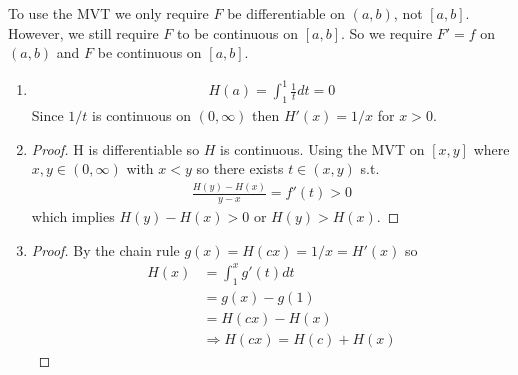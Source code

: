 To use the MVT we only require $F$ be differentiable on $(a,b)$,
not $[a,b]$. However, we still require $F$ to be continuous on 
$[a,b]$.
So we require $F'=f$ on $(a,b)$ and $F$ be continuous on $[a,b]$.

\begin{enumerate}[label=(\alph*)]
    \item 
    \begin{align*}
        H(a) = \int_1^1 \frac{1}{t} dt = 0
    \end{align*}
    Since $1/t$ is continuous on $(0,\infty)$ then $H'(x)=1/x$
    for $x>0$.

    \item
    \begin{proof}
        H is differentiable so $H$ is continuous. Using the MVT 
        on $[x,y]$ where $x,y\in (0,\infty)$ with $x<y$ so 
        there exists $t\in(x,y)$ s.t. 
        \begin{align*}
            \frac{H(y)-H(x)}{y-x} = f'(t)>0
        \end{align*}
        which implies $H(y)-H(x)>0$ or $H(y)>H(x)$.
    \end{proof}

    \item
    \begin{proof}
        By the chain rule $g(x) = H(cx) = 1/x = H'(x)$ so 
        \begin{align*}
            H(x) &= \int_1^x g'(t) dt \\ 
            &= g(x) - g(1) \\
            &= H(cx) - H(x) \\
            &\Rightarrow H(cx) = H(c) + H(x) 
        \end{align*}
    \end{proof}
\end{enumerate}

